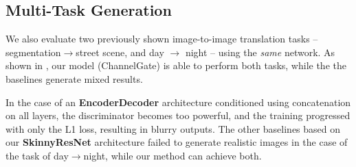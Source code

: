 
\vspace{-1mm}
\subsection{Multi-Task Generation}
We also evaluate two previously shown image-to-image translation tasks -- segmentation$\rightarrow$street scene, and day $\rightarrow$ night -- using the {\em same} network. 
As shown in , our model (ChannelGate) is able to perform both tasks, while the the baselines generate mixed results. 

In the case of an \textbf{EncoderDecoder} architecture \cite{huang2018multimodal} conditioned using concatenation on all layers, the discriminator becomes too powerful, and the training progressed with only the L1 loss, resulting in blurry outputs. The other baselines based on our \textbf{SkinnyResNet} architecture failed to generate realistic images in the case of the task of day$\rightarrow$night, while our method can achieve both.



